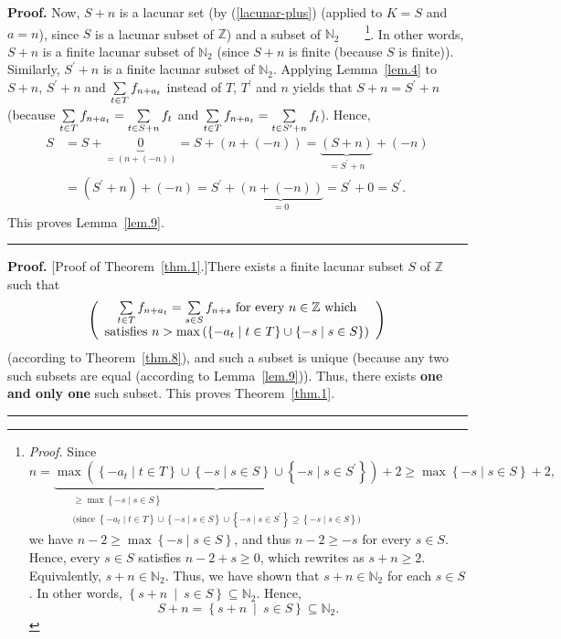 \documentclass[numbers=enddot,12pt,final,onecolumn,notitlepage]{scrartcl}%
\numberwithin{exer}{section}
\theoremstyle{definition}
\newenvironment{proof}[1][Proof]{\noindent\textbf{#1.} }{\ \rule{0.5em}{0.5em}}
\let\sumnonlimits\sum
\renewcommand{\sum}{\sumnonlimits\limits}
\begin{document}
\begin{proof}
Now, $S+n$ is a lacunar set (by (\ref{lacunar-plus}) (applied to $K=S$ and
$a=n$), since $S$ is a lacunar subset of $\mathbb{Z}$) and a subset of
$\mathbb{N}_{2}$\ \ \ \ \footnote{\textit{Proof.} Since%
\[
n=\underbrace{\max\left(  \left\{  -a_{t}\mid t\in T\right\}  \cup\left\{
-s\mid s\in S\right\}  \cup\left\{  -s\mid s\in S^{\prime}\right\}  \right)
}_{\substack{\geq\max\left\{  -s\mid s\in S\right\}  \\\text{(since }\left\{
-a_{t}\mid t\in T\right\}  \cup\left\{  -s\mid s\in S\right\}  \cup\left\{
-s\mid s\in S^{\prime}\right\}  \supseteq\left\{  -s\mid s\in S\right\}
\text{)}}}+2\geq\max\left\{  -s\mid s\in S\right\}  +2,
\]
we have $n-2\geq\max\left\{  -s\mid s\in S\right\}  $, and thus $n-2\geq-s$
for every $s\in S$. Hence, every $s\in S$ satisfies $n-2+s\geq0$, which
rewrites as $s+n\geq2$. Equivalently, $s+n\in\mathbb{N}_{2}$. Thus, we have
shown that $s+n\in\mathbb{N}_{2}$ for each $s\in S$. In other words, $\left\{
s+n\ \mid\ s\in S\right\}  \subseteq\mathbb{N}_{2}$. Hence,
\[
S+n=\left\{  s+n\ \mid\ s\in S\right\}  \subseteq\mathbb{N}_{2}.
\]
}. In other words, $S+n$ is a finite lacunar subset of $\mathbb{N}_{2}$ (since
$S+n$ is finite (because $S$ is finite)). Similarly, $S^{\prime}+n$ is a
finite lacunar subset of $\mathbb{N}_{2}$. Applying Lemma~\ref{lem.4} to
$S+n$, $S^{\prime}+n$ and $\sum\limits_{t\in T}f_{n+a_{t}}$ instead of $T$,
$T^{\prime}$ and $n$ yields that $S+n=S^{\prime}+n$ (because $\sum
\limits_{t\in T}f_{n+a_{t}}=\sum\limits_{t\in S+n}f_{t}$ and $\sum
\limits_{t\in T}f_{n+a_{t}}=\sum\limits_{t\in S^{\prime}+n}f_{t}$). Hence,%
\begin{align*}
S  &  =S+\underbrace{0}_{=\left(  n+\left(  -n\right)  \right)  }=S+\left(
n+\left(  -n\right)  \right)  =\underbrace{\left(  S+n\right)  }_{=S^{\prime
}+n}+\left(  -n\right) \\
&  =\left(  S^{\prime}+n\right)  +\left(  -n\right)  =S^{\prime}%
+\underbrace{\left(  n+\left(  -n\right)  \right)  }_{=0}=S^{\prime
}+0=S^{\prime}.
\end{align*}
This proves Lemma~\ref{lem.9}.
\end{proof}

\begin{proof}
[Proof of Theorem~\ref{thm.1}.]There exists a finite lacunar subset $S$ of
$\mathbb{Z}$ such that
\[
\left(
\begin{array}
[c]{c}%
\sum\limits_{t\in T}f_{n+a_{t}}=\sum\limits_{s\in S}f_{n+s}\text{ for every
}n\in\mathbb{Z}\text{ which}\\
\text{satisfies }n>\max\left(  \left\{  -a_{t}\mid t\in T\right\}
\cup\left\{  -s\mid s\in S\right\}  \right)
\end{array}
\right)
\]
(according to Theorem~\ref{thm.8}), and such a subset is unique (because any
two such subsets are equal (according to Lemma~\ref{lem.9})). Thus, there
exists \textbf{one and only one} such subset. This proves Theorem~\ref{thm.1}.
\end{proof}
\end{document}
